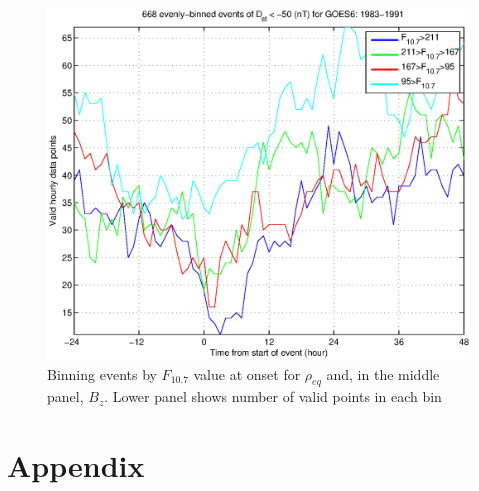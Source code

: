 \documentclass[10pt,twocolumn]{article}
\begin{document}
\begin{figure}[tp!]
\includegraphics[scale=0.40]{paperfigures/HighLowF107rhoeq-Dst50-GOES6-1983-1991-valid.eps}
\caption{Binning events by $F_{10.7}$ value at onset for $\rho_{eq}$ and, in the middle panel, $B_z$. Lower panel shows number of valid points in each bin}
\label{f107bin}
\end{figure}


\clearpage

\section{Appendix}
\hfill
\end{document}
